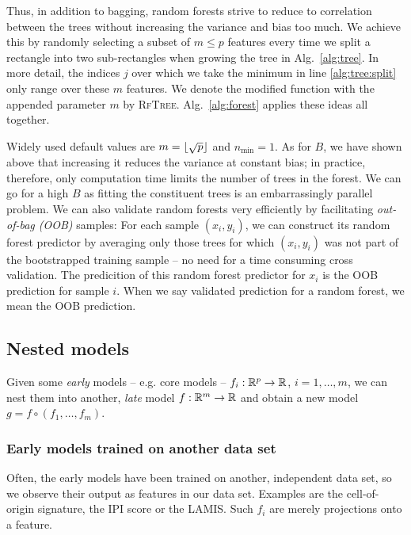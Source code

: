 Thus, in addition to bagging, random forests strive to reduce to correlation between the trees 
without increasing the variance and bias too much. We achieve this by randomly selecting a subset
of $m \leq p$ features every time we split a rectangle into two sub-rectangles when growing the 
tree in Alg.\ \ref{alg:tree}. In more detail, the indices $j$ over which we take the minimum in 
line \ref{alg:tree:split} only range over 
these $m$ features. We denote the modified function with the appended parameter $m$ by 
\textsc{RfTree}. Alg.\ \ref{alg:forest} applies these ideas all together.



Widely used default values are $m = \lfloor\sqrt{p}\rfloor$ and $n_\text{min} = 1$. As for $B$, we have 
shown above that increasing it reduces the variance at constant bias; in practice, therefore, only 
computation time limits the number of trees in the forest. We can go for a high $B$ as fitting the 
constituent trees is an embarrassingly parallel problem. We can 
also validate random forests very efficiently by facilitating \textit{out-of-bag (OOB)} samples: 
For each sample $(x_i, y_i)$, we can construct its random forest predictor by averaging only those 
trees for which $(x_i, y_i)$ was not part of the bootstrapped training sample -- no need for a time 
consuming cross validation. The predicition of this random forest predictor for $x_i$ is the OOB 
prediction for sample $i$. When we say validated prediction for a random forest, we mean the 
OOB prediction.

\subsection{Nested models}\label{subsec:nested-models}

Given some \textit{early} models -- e.g. core models -- $f_i: \mathbb{R}^p \to \mathbb{R}$, $i = 1, \ldots, m$, 
we can nest them into another, \textit{late} model $f: \mathbb{R}^m \to \mathbb{R}$ and obtain a new model 
$g = f \circ (f_1, \ldots, f_m)$. 

\subsubsection{Early models trained on another data set}
Often, the early models have been trained on another, independent data set, so we observe their 
output as features in our data set. Examples are the cell-of-origin signature, the IPI score or the 
LAMIS. Such $f_i$ are merely projections onto a feature.

